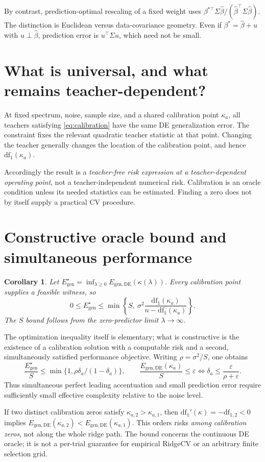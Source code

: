 \documentclass[11pt]{article}
\newtheorem{corollary}{Corollary}
\newcommand{\df}{\mathrm{df}}
\newcommand{\Eg}{E_{\mathrm{gen,DE}}}
\begin{document}
By contrast, prediction-optimal rescaling of a fixed weight uses
$\beta^{*\top}\Sigma\hat\beta/(\hat\beta^\top\Sigma\hat\beta)$.
The distinction is Euclidean versus data-covariance geometry. Even if
$\beta^*=\hat\beta+u$ with $u\perp\hat\beta$, prediction error is
$u^\top\Sigma u$, which need not be small.

\section{What is universal, and what remains teacher-dependent?}
At fixed spectrum, noise, sample size, and a shared calibration point
$\kappa_a$, all teachers satisfying \eqref{eq:calibration} have the same
DE generalization error. The constraint fixes the relevant quadratic teacher
statistic at that point. Changing the teacher generally changes the location
of the calibration point, and hence $\df_1(\kappa_a)$.

Accordingly the result is a \emph{teacher-free risk expression at a
teacher-dependent operating point}, not a teacher-independent numerical risk.
Calibration is an oracle condition unless its needed statistics can be
estimated. Finding a zero does not by itself supply a practical CV procedure.

\section{Constructive oracle bound and simultaneous performance}
\begin{corollary}
Let $E_{\mathrm{gen}}^\star=\inf_{\lambda\ge0}\Eg(\kappa(\lambda))$.
Every calibration point supplies a feasible witness, so
\[
 0\le E_{\mathrm{gen}}^\star\le
 \min\left\{S,\ \sigma^2\frac{\df_1(\kappa_a)}{n-\df_1(\kappa_a)}\right\}.
\]
The $S$ bound follows from the zero-predictor limit $\lambda\to\infty$.
\end{corollary}
The optimization inequality itself is elementary; what is constructive is
the existence of a calibration solution with a computable risk and a second,
simultaneously satisfied performance objective.
Writing $\rho=\sigma^2/S$, one obtains
\[
 \frac{E_{\mathrm{gen}}^\star}{S}
 \le\min\{1,\rho\delta_a/(1-\delta_a)\},\qquad
 \frac{\Eg(\kappa_a)}S\le\varepsilon
 \Longleftrightarrow
 \delta_a\le\frac{\varepsilon}{\rho+\varepsilon}.
\]
Thus simultaneous perfect leading accentuation and small prediction error
require sufficiently small effective complexity relative to the noise level.

If two distinct calibration zeros satisfy $\kappa_{a,2}>\kappa_{a,1}$,
then $\df_1'(\kappa)=-\df_{1,2}<0$ implies
$\Eg(\kappa_{a,2})<\Eg(\kappa_{a,1})$.
This orders risks \emph{among calibration zeros}, not along the whole ridge
path. The bound concerns the continuous DE oracle; it is not a per-trial
guarantee for empirical RidgeCV or an arbitrary finite selection grid.
\end{document}

